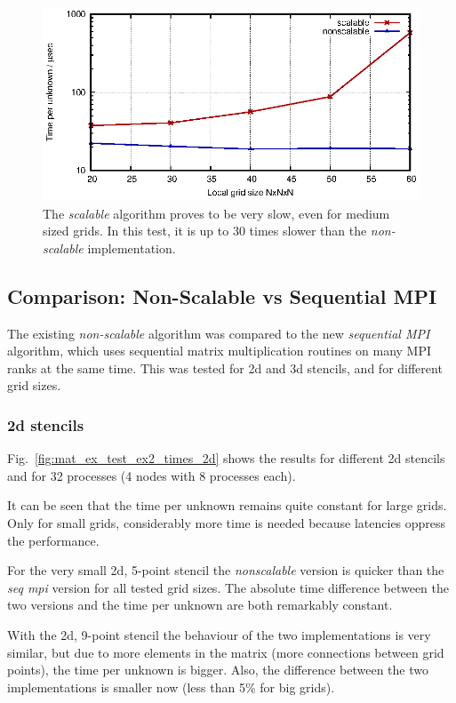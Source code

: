 \begin{figure}[tbp]
	\centering
	\includegraphics[width=1\textwidth]{scalable}
	\caption{The \textit{scalable} algorithm proves to be very slow, even for medium sized grids. In this test, it is up to 30 times slower than the \textit{non-scalable} implementation.} 
	\label{fig:scalable}
\end{figure}

\subsection{Comparison: Non-Scalable vs Sequential MPI}
The existing \textit{non-scalable} algorithm was compared to the new \textit{sequential MPI} algorithm, which uses sequential matrix multiplication routines on many MPI ranks at the same time. This was tested for 2d and 3d stencils, and for different grid sizes.

\subsubsection*{2d stencils}
Fig.~\ref{fig:mat_ex_test_ex2_times_2d} shows the results for different 2d stencils and for 32 processes (4 nodes with 8 processes each). 

It can be seen that the time per unknown remains quite constant for large grids. Only for small grids, considerably more time is needed because latencies oppress the performance.


For the very small 2d, 5-point stencil the \textit{nonscalable} version is quicker than the \textit{seq mpi} version for all tested grid sizes. The absolute time difference between the two versions and the time per unknown are both remarkably constant. 

With the 2d, 9-point stencil the behaviour of the two implementations is very similar, but due to more elements in the matrix (more connections between grid points), the time per unknown is bigger. Also, the difference between the two implementations is smaller now (less than 5\% for big grids). 

